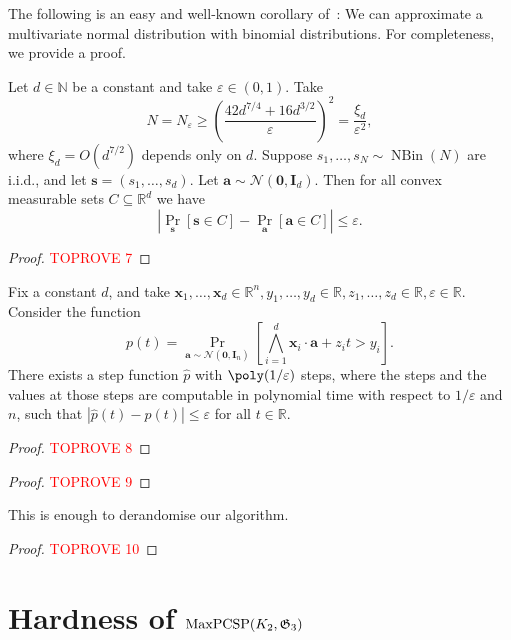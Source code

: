 \documentclass[a4paper,11pt, DIV=11]{scrartcl}
\newcommand{\vx}{\ensuremath{\mathbf{x}}}
\newcommand{\va}{\ensuremath{\mathbf{a}}}
\renewcommand{\epsilon}{\varepsilon}
\renewcommand{\G}{\ensuremath{\mathfrak{G}}}
\DeclareMathOperator{\NBin}{NBin}
\DeclareMathOperator{\maxPCSP}{\textup{MaxPCSP}}
\theoremstyle{plain}
\theoremstyle{definition}
\begin{document}
The following is an easy and well-known corollary of~: We can approximate a multivariate normal distribution with binomial distributions. For completeness, we provide a proof.

\begin{corollary}\label{corr:appliedBerryEsseen}
Let $d \in \mathbb{N}$ be a constant and take $\varepsilon \in (0, 1)$. Take
\begin{equation}\label{eq:defN}
N = N_\varepsilon \geq {\left(\frac{42 d^{7/4} +16 d^{3/2} }{\varepsilon}\right)}^2 = \frac{\xi_d}{\varepsilon^2},
\end{equation}
where $\xi_d = O(d^{7/2})$ depends only on $d$. Suppose
$s_1, \ldots, s_N \sim \NBin(N)$ are i.i.d., and let $\mathbf{s} = (s_1, \ldots, s_d)$.
 Let $\va \sim \mathcal{N}(\mathbf{0}, \mathbf{I}_d)$. Then for all convex measurable sets $C \subseteq \mathbb{R}^d$ we have
\[
| \Pr_{\mathbf{s}}[ \mathbf{s} \in C] - \Pr_{\va}[\va \in C] | \leq \varepsilon.
\]
\end{corollary}
\begin{proof}\textcolor{red}{TOPROVE 7}\end{proof}

\begin{theorem}\label{thm:stepApprox}
    Fix a constant $d$, and take $\vx_{1}, \ldots, \vx_d \in \mathbb{R}^n, y_1, \ldots, y_d \in \mathbb{R}, z_1, \ldots, z_d \in \mathbb{R}, \epsilon \in \mathbb{R}$. Consider the function
    \[
    p(t) = \Pr_{\va \sim \mathcal{N}(\mathbf{0}, \mathbf{I}_n)}\left[\bigwedge_{i=1}^d \vx_{i} \cdot \va + z_i t > y_i \right].
    \]
    There exists a step function $\widehat{p}$ with $\poly(1/\epsilon)$ steps, where the steps and the values at those steps are computable in polynomial time with respect to $1 / \epsilon$
    and $n$, such that $| \widehat{p}(t) - p(t)| \leq \epsilon$ for all $t \in \mathbb{R}$.
\end{theorem}
\begin{proof}\textcolor{red}{TOPROVE 8}\end{proof}

\begin{proof}\textcolor{red}{TOPROVE 9}\end{proof}

This is enough to derandomise our algorithm.

\begin{proof}\textcolor{red}{TOPROVE 10}\end{proof}


\section{\texorpdfstring{Hardness of $\maxPCSP(K_2, \G_3)$}{Hardness of maxPCSP(K2,G3)}}
\label{sec:hardness}
\end{document}
